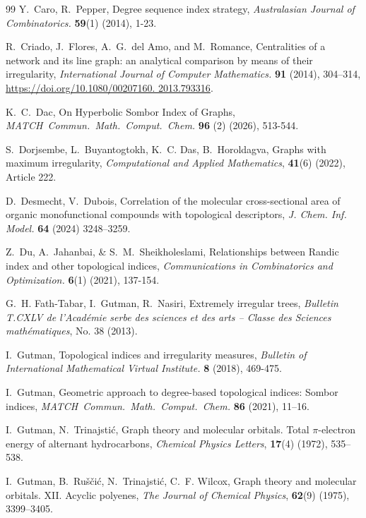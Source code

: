 \documentclass[12pt, a4paper]{article}
\begin{document}
\begin{thebibliography}{99}
 Y.~Caro, R.~Pepper,  Degree sequence index strategy, {\em Australasian Journal of Combinatorics.} \textbf{59}(1) (2014), 1-23.

 R.~Criado, J.~Flores, A.~G.~del Amo, and M.~Romance, Centralities of a network and its line graph: an analytical comparison by means of their irregularity, {\em International Journal of Computer Mathematics.} \textbf{91} (2014), 304--314, \url{https://doi.org/10.1080/00207160. 2013.793316}.


 K.~C.~Dac, On Hyperbolic Sombor Index of Graphs, {\em MATCH~Commun.~Math.~Comput.~Chem.} \textbf{96} (2) (2026), 513-544.

S.~Dorjsembe, L.~Buyantogtokh, K.~C. Das, B.~Horoldagva,
 Graphs with maximum irregularity,
 \emph{Computational and Applied Mathematics}, \textbf{41}(6) (2022), Article 222.

 D.~Desmecht, V.~Dubois, Correlation of the molecular cross-sectional area of organic monofunctional compounds with topological descriptors, {\em J. Chem. Inf. Model.} \textbf{64} (2024) 3248–3259.

 Z.~Du, A.~Jahanbai, \& S.~M.~Sheikholeslami, Relationships between Randic index and other topological indices,  {\em Communications in Combinatorics and Optimization.}  \textbf{6}(1) (2021), 137-154.

G.~H. Fath-Tabar, I.~Gutman, R.~Nasiri,
Extremely irregular trees,
\emph{Bulletin T.CXLV de l’Académie serbe des sciences et des arts – Classe des Sciences mathématiques}, No. 38 (2013).


 I.~Gutman, Topological indices and irregularity measures, {\em Bulletin of International Mathematical Virtual Institute.} \textbf{8} (2018), 469-475.

 I.~Gutman, Geometric approach to degree-based topological indices: Sombor indices, {\em MATCH~Commun.~Math.~Comput.~Chem.} \textbf{86} (2021), 11–16.

 I.~Gutman, N.~Trinajstić,
 Graph theory and molecular orbitals. Total $\pi$-electron energy of alternant hydrocarbons, \emph{Chemical Physics Letters}, \textbf{17}(4) (1972), 535–538.

I.~Gutman, B.~Ruščić, N.~Trinajstić, C.~F. Wilcox,
Graph theory and molecular orbitals. XII. Acyclic polyenes,
\emph{The Journal of Chemical Physics}, \textbf{62}(9) (1975), 3399–3405.


\end{thebibliography}
\end{document}
